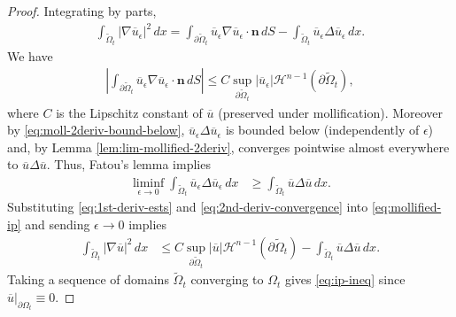 \documentclass[12pt]{amsart}
\theoremstyle{definition}
\theoremstyle{remark}
\begin{document}
\begin{proof}
  Integrating by parts,
  \begin{align}
    \label{eq:mollified-ip} \int_{\tilde{\Omega}_t}|\nabla \overline{u}_{\epsilon}|^2 \, dx = \int_{\partial
\tilde{\Omega}_t}\overline{u}_{\epsilon} \nabla\overline{u}_{\epsilon} \cdot \mathbf{n} \, dS -
\int_{\tilde{\Omega}_t}\overline{u}_{\epsilon} \Delta \overline{u}_{\epsilon} \, dx.
  \end{align} We have
  \begin{align}
    \label{eq:1st-deriv-ests} \left|\int_{\partial \tilde{\Omega}_t}\overline{u}_{\epsilon}
\nabla\overline{u}_{\epsilon} \cdot \mathbf{n} \, dS\right| \leq C \sup_{\partial
\tilde{\Omega}_t}|\overline{u}_{\epsilon}| \mathcal{H}^{n-1}(\partial \tilde{\Omega}_t),
  \end{align} where $C$ is the Lipschitz constant of $\overline{u}$ (preserved
under mollification). Moreover by \eqref{eq:moll-2deriv-bound-below}, $\overline{u}_\epsilon \Delta \overline{u}_\epsilon $ is bounded below (independently of $\epsilon$) and, by Lemma \ref{lem:lim-mollified-2deriv}, converges pointwise almost everywhere to $\overline{u}\Delta\overline{u}$. Thus, Fatou's lemma implies
  \begin{align} \label{eq:2nd-deriv-convergence} \liminf_{\epsilon \rightarrow 0} \int_{\tilde{\Omega}_t}\overline{u}_{\epsilon} \Delta\overline{u}_{\epsilon} \, dx & \geq \int_{\tilde{\Omega}_t}\overline{u} \Delta \overline{u} \, dx .
  \end{align}
Substituting \eqref{eq:1st-deriv-ests} and \eqref{eq:2nd-deriv-convergence} into \eqref{eq:mollified-ip} and sending $\epsilon \rightarrow 0$ implies
  \begin{align*} \int_{\tilde{\Omega}_t}|\nabla\overline{u}|^2 \, dx &\leq C \sup_{\partial
\tilde{\Omega}_t}|\overline{u}| \mathcal{H}^{n-1}(\partial \tilde{\Omega}_t) - \int_{\tilde{\Omega}_t}\overline{u}
\Delta \overline{u} \, dx.
  \end{align*} Taking a sequence of domains $\tilde{\Omega}_t$ converging to $\Omega_t$
gives \eqref{eq:ip-ineq} since \(\overline{u}|_{\partial \Omega_t} \equiv 0\).
\end{proof}

\printbibliography
\end{document}

